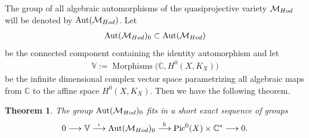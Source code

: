 \documentclass[11pt]{article}
\numberwithin{equation}{section}
\newtheorem{Theorem}{Theorem}[section]
\begin{document}
The group of all algebraic automorphisms of the quasiprojective variety
${\mathcal M}_{\rm Hod}$ will be denoted by $\operatorname{Aut}({\mathcal M}_{\rm Hod})$. Let
\begin{gather*}
\operatorname{Aut}({\mathcal M}_{\rm Hod})_0 \subset \operatorname{Aut}({\mathcal M}_{\rm Hod})
\end{gather*}
be the connected component containing the identity automorphism and
 let
\begin{gather*}
{\mathbb V} := \operatorname{Morphisms}\big({\mathbb C}, H^0(X, K_X)\big)
\end{gather*}
be the inf\/inite dimensional complex vector space parametrizing all algebraic maps from $\mathbb C$ to the af\/f\/ine space $H^0(X, K_X)$. Then we have the following theorem.
\begin{Theorem}\label{thm1}
The group $\operatorname{Aut}({\mathcal M}_{\rm Hod})_0$ fits in a short exact sequence of groups
\begin{gather*}
0 \longrightarrow {\mathbb V} \stackrel{\iota}{\longrightarrow} \operatorname{Aut}({\mathcal M}_{\rm Hod})_0 \stackrel{h}{\longrightarrow}
\operatorname{Pic}^0(X)\times {\mathbb C}^* \longrightarrow 0 .
\end{gather*}
\end{Theorem}
\end{document}
